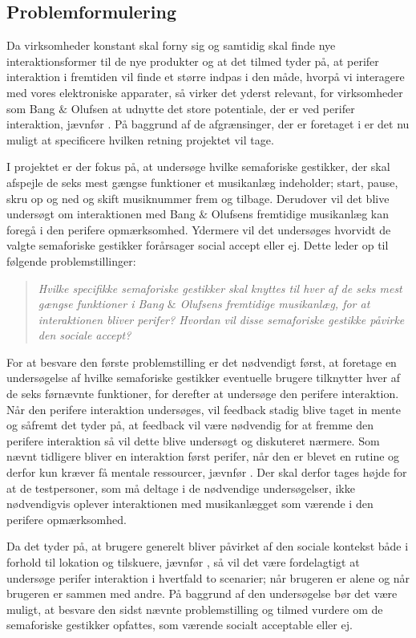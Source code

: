 \subsection{Problemformulering}
\label{Problemformulering}
%
Da virksomheder konstant skal forny sig og samtidig skal finde nye interaktionsformer til de nye produkter og at det tilmed tyder på, at perifer interaktion i fremtiden vil finde et større indpas i den måde, hvorpå vi interagere med vores elektroniske apparater, så virker det yderst relevant, for virksomheder som Bang $\&$ Olufsen at udnytte det store potentiale, der er ved perifer interaktion, jævnfør . På baggrund af de afgrænsinger, der er foretaget i  er det nu muligt at specificere hvilken retning projektet vil tage.  

I projektet er der fokus på, at undersøge hvilke semaforiske gestikker, der skal afspejle de seks mest gængse funktioner et musikanlæg indeholder; start, pause, skru op og ned og skift musiknummer frem og tilbage. Derudover vil det blive undersøgt om interaktionen med Bang $\&$ Olufsens fremtidige musikanlæg kan foregå i den perifere opmærksomhed. Ydermere vil det undersøges hvorvidt de valgte semaforiske gestikker forårsager social accept eller ej. Dette leder op til følgende problemstillinger:\blankline
%
\begin{quotation}
\noindent
\textit{Hvilke specifikke semaforiske gestikker skal knyttes til hver af de seks mest gængse funktioner i Bang $\&$ Olufsens fremtidige musikanlæg, for at interaktionen bliver perifer?\blankline
%
Hvordan vil disse semaforiske gestikke påvirke den sociale accept?}\blankline
\end{quotation}
%
For at besvare den første problemstilling er det nødvendigt først, at foretage en undersøgelse af hvilke semaforiske gestikker eventuelle brugere tilknytter hver af de seks førnævnte funktioner, for derefter at undersøge den perifere interaktion. Når den perifere interaktion undersøges, vil feedback stadig blive taget in mente og såfremt det tyder på, at feedback vil være nødvendig for at fremme den perifere interaktion så vil dette blive undersøgt og diskuteret nærmere. Som nævnt tidligere bliver en interaktion først perifer, når den er blevet en rutine og derfor kun kræver få mentale ressourcer, jævnfør . Der skal derfor tages højde for at de testpersoner, som må deltage i de nødvendige undersøgelser, ikke nødvendigvis oplever interaktionen med musikanlægget som værende i den perifere opmærksomhed.    

Da det tyder på, at brugere generelt bliver påvirket af den sociale kontekst både i forhold til lokation og tilskuere, jævnfør , så vil det være fordelagtigt at undersøge perifer interaktion i hvertfald to scenarier; når brugeren er alene og når brugeren er sammen med andre. På baggrund af den undersøgelse bør det være muligt, at besvare den sidst nævnte problemstilling og tilmed vurdere om de semaforiske gestikker opfattes, som værende socialt acceptable eller ej. 



